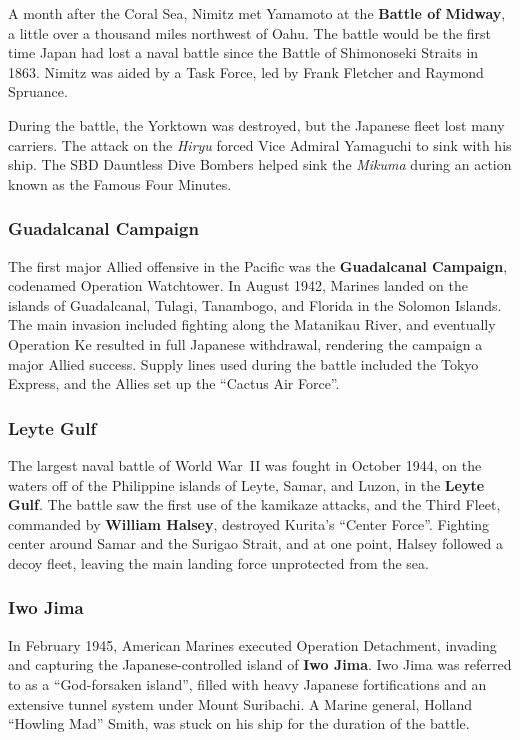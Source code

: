 A month after the Coral Sea, Nimitz met Yamamoto at the \textbf{Battle of Midway},
a little over a thousand miles northwest of Oahu.
The battle would be the first time Japan had lost a naval battle
since the Battle of Shimonoseki Straits in 1863.
Nimitz was aided by a Task Force, led by Frank Fletcher and Raymond Spruance.

During the battle, the Yorktown was destroyed, but the Japanese fleet lost many carriers.
The attack on the \textit{Hiryu} forced Vice Admiral Yamaguchi to sink with his ship.
The SBD Dauntless Dive Bombers helped sink the \textit{Mikuma}
during an action known as the Famous Four Minutes.

\subsubsection*{Guadalcanal Campaign}

The first major Allied offensive in the Pacific was the \textbf{Guadalcanal Campaign},
codenamed Operation Watchtower.
In August 1942,
Marines landed on the islands of Guadalcanal, Tulagi, Tanambogo, and Florida in the Solomon Islands.
The main invasion included fighting along the Matanikau River,
and eventually Operation Ke resulted in full Japanese withdrawal,
rendering the campaign a major Allied success.
Supply lines used during the battle included the Tokyo Express,
and the Allies set up the ``Cactus Air Force''.

\subsubsection*{Leyte Gulf}

The largest naval battle of World War~II was fought in October 1944,
on the waters off of the Philippine islands of Leyte, Samar, and Luzon,
in the \textbf{Leyte Gulf}.
The battle saw the first use of the kamikaze attacks,
and the Third Fleet, commanded by \textbf{William Halsey}, destroyed Kurita's ``Center Force''.
Fighting center around Samar and the Surigao Strait,
and at one point, Halsey followed a decoy fleet,
leaving the main landing force unprotected from the sea.

\subsubsection*{Iwo Jima}

In February 1945, American Marines executed Operation Detachment,
invading and capturing the Japanese-controlled island of \textbf{Iwo Jima}.
Iwo Jima was referred to as a ``God-forsaken island'',
filled with heavy Japanese fortifications and an extensive tunnel system under Mount Suribachi.
A Marine general, Holland ``Howling Mad'' Smith,
was stuck on his ship for the duration of the battle.

